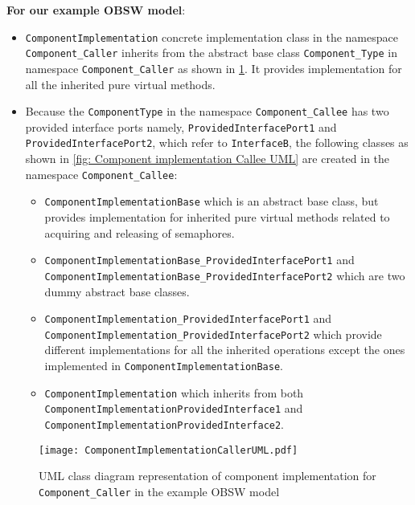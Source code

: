 \textbf{For our example OBSW model}:
\begin{itemize}
\item \texttt{Component\allowbreak Implementation} concrete implementation class in the namespace \texttt{Component\_Caller} inherits from the abstract base class \texttt{Component\_Type} in namespace \texttt{Component\allowbreak\_Caller} as shown in \cref{fig: Component implementation Caller UML}. It provides implementation for all the inherited pure virtual methods.
\item Because the \texttt{ComponentType} in the namespace \texttt{Component\_Callee} has two provided interface ports namely, \texttt{Provided\allowbreak Interface\allowbreak Port1} and \texttt{Provided\allowbreak Interface\allowbreak Port2}, which refer to \texttt{InterfaceB}, the following classes as shown in \cref{fig: Component implementation Callee UML} are created in the namespace \texttt{Component\_Callee}:
\begin{itemize}
\item \texttt{ComponentImplementation\allowbreak Base} which is an abstract base class, but provides implementation for inherited pure virtual methods related to acquiring and releasing of semaphores.
\item \texttt{Component\allowbreak Implementation\allowbreak Base\_\allowbreak Provided\allowbreak Interface\allowbreak Port1\allowbreak} and \texttt{Component\allowbreak Implementation\allowbreak Base\_\allowbreak Provided\allowbreak Interface\allowbreak Port2\allowbreak} which are two dummy abstract base classes.
\item \texttt{Component\allowbreak Implementation\_\allowbreak Provided\allowbreak Interface\allowbreak Port1} and \texttt{Component\allowbreak Impl\allowbreak emen\allowbreak tation\_\allowbreak Provided\allowbreak Interface\allowbreak Port2} which provide different implementations for all the inherited operations except the ones implemented in \texttt{Component\allowbreak Implementation\allowbreak Base}.
\item \texttt{Component\allowbreak Implementation} which inherits from both \texttt{Component\allowbreak Implemen\allowbreak tation\allowbreak Provided\allowbreak Interface1} and \texttt{Component\allowbreak Implementation\allowbreak Provided\allowbreak Inter\allowbreak face2}.
\end{itemize}   
\end{itemize}

\begin{figure}[h]
	\centering
	\texttt{[image: ComponentImplementationCallerUML.pdf]}
	\caption{UML class diagram representation of component implementation for \texttt{Component\_\allowbreak Caller} in the example OBSW model}
	\label{fig: Component implementation Caller UML}
\end{figure} 


